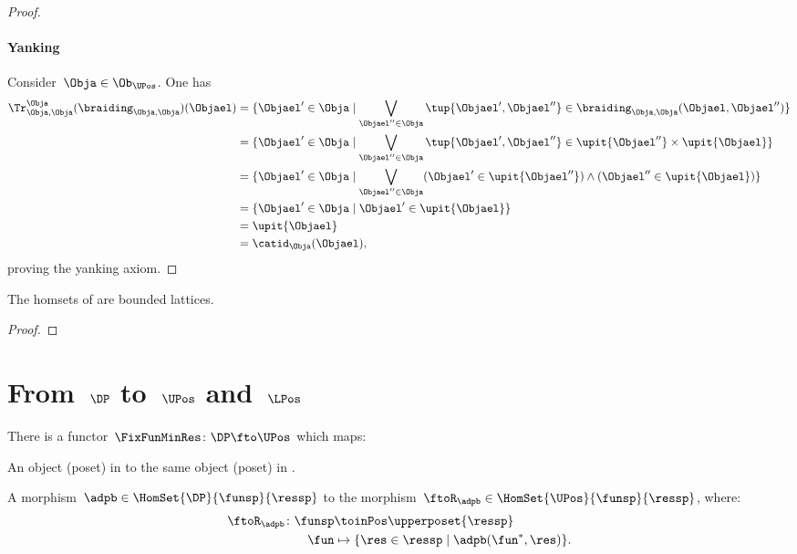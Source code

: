 \begin{proof}
    \paragraph*{Yanking}
    Consider~$\Obja\in \Ob_{\UPos}$. One has
    \begin{equation*}
    \begin{aligned}
        \Tr_{\Obja,\Obja}^{\Obja}(\braiding_{\Obja,\Obja})(\Objael)&=\{ \Objael'\in \Obja \mid \bigvee_{\Objael''\in \Obja}\tup{\Objael',\Objael''}\in \braiding_{\Obja,\Obja}(\Objael,\Objael'')\}\\
        &=\{ \Objael'\in \Obja \mid \bigvee_{\Objael''\in \Obja}\tup{\Objael',\Objael''}\in \upit\{\Objael''\}\times \upit\{ \Objael\}\}\\
        &=\{ \Objael'\in \Obja \mid \bigvee_{\Objael''\in \Obja} (\Objael'\in \upit\{\Objael''\}) \wedge(\Objael'' \in \upit\{ \Objael\})\}\\
        &=\{ \Objael'\in \Obja \mid \Objael'\in \upit\{\Objael\}\}\\
        &=\upit \{\Objael\}\\
        &=\catid_\Obja(\Objael),
    \end{aligned}
    \end{equation*}
    proving the yanking axiom.
\end{proof}

\begin{lemma}\label{lem:UPos-is-traced}
    The homsets of \UPos are bounded lattices.
  \end{lemma}
  \begin{proof}
  \end{proof}
  
  

\section{From~$\DP$ to~$\UPos$ and~$\LPos$}
\begin{lemma}
\label{lem:covfunctor}
There is a functor~$\FixFunMinRes\colon \DP \fto \UPos$ which maps:
\begin{compactenum}
\item An object (poset) in \DP to the same object (poset) in \UPos.
\item A morphism~$\adpb\in \HomSet{\DP}{\funsp}{\ressp}$ to the morphism~$\ftoR_{\adpb}\in \HomSet{\UPos}{\funsp}{\ressp}$, where:
\begin{equation}
\begin{aligned}
    \ftoR_{\adpb}\colon \funsp &\toinPos \upperposet{\ressp}\\
    \fun&\mapsto \{\res \in \ressp\mid \adpb(\fun^*,\res)\}.
\end{aligned}
\end{equation}
\end{compactenum}
\end{lemma}

